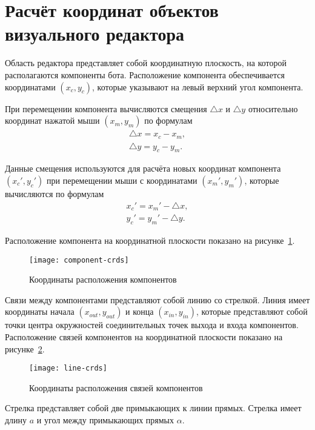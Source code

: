 {
\newcommand{\scale}{0.65}

\section{Расчёт координат объектов визуального редактора}


Область редактора представляет собой координатную плоскость,
на которой располагаются компоненты бота.
Расположение компонента обеспечивается координатами $ ( x_c , y_c ) $,
которые указывают
на левый верхний угол компонента.

При перемещении компонента вычисляются смещения
$ \bigtriangleup x $ и $\bigtriangleup y$
относительно координат нажатой мыши
$ (x_m, y_m) $ по формулам
\begin{gather}
	\bigtriangleup x = x_c - x_m, \\
	\bigtriangleup y = y_c - y_m.
\end{gather}

Данные смещения используются для расчёта новых координат компонента
$ (x_c', y_c') $ при перемещении мыши с координатами
$ (x_m', y_m') $,
которые вычисляются по формулам
\begin{gather}
	x_c' = x_m' - \bigtriangleup x, \\
	y_c' = y_m' - \bigtriangleup y.
\end{gather}

Расположение компонента на координатной плоскости показано
на рисунке~\ref{f:component-crds}.

\begin{figure}[h]
	\centering
	\texttt{[image: component-crds]}
	\caption{Координаты расположения компонентов}
	\label{f:component-crds}
\end{figure}

Связи между компонентами представляют собой линию со стрелкой.
Линия имеет координаты начала
$ (x_{out}, y_{out}) $
и конца
$ (x_{in}, y_{in}) $, которые представляют собой точки центра окружностей
соединительных точек выхода и входа компонентов.
Расположение связей компонентов на координатной плоскости показано на
рисунке~\ref{f:line-crds}.

\begin{figure}[h]
	\centering
	\texttt{[image: line-crds]}
	\caption{Координаты расположения связей компонентов}
	\label{f:line-crds}
\end{figure}

Стрелка представляет собой две примыкающих к линии прямых.
Стрелка имеет длину
$ a $ и угол между примыкающих прямых $ \alpha $.

}
